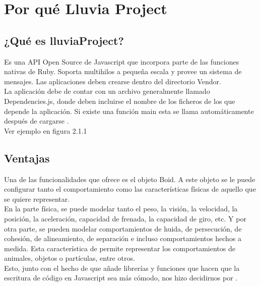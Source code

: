 \section{Por qué Lluvia Project}
\label{section:por_que}

\subsection{¿Qué es lluviaProject?}
\label{subsection:que_es}

Es una API Open Source de Javascript que incorpora parte de las funciones nativas de Ruby. Soporta multihilos a pequeña escala y provee un 
sistema de mensajes. Las aplicaciones deben crearse dentro del directorio Vendor. \\

La aplicación debe de contar con un archivo generalmente llamado Dependencies.js, donde deben incluirse el nombre de los ficheros de los que 
depende la aplicación. Si existe una función main esta se llama automáticamente después de cargarse \lluvia.\\

Ver ejemplo en figura 2.1.1


\subsection{Ventajas}
\label{subsection:ventajas}


Una de las funcionalidades que ofrece \lluvia{} es el objeto Boid. A este objeto se le puede configurar tanto el comportamiento como las 
características físicas de aquello que se quiere representar.\\

En la parte física, se puede modelar tanto el peso, la visión, la velocidad, la posición, la aceleración, capacidad de frenada, la capacidad 
de giro, etc. Y por otra parte, se pueden modelar comportamientos de huida, de persecución, de cohesión, de alineamiento, de separación e 
incluso comportamientos hechos a medida. Esta característica de \lluvia{} permite representar los comportamientos de animales, objetos 
o partículas, entre otros.\\

Esto, junto con el hecho de que añade librerías y funciones que hacen que la escritura de código en Javascript sea más cómodo, nos hizo 
decidirnos por \lluvia{}.\\
